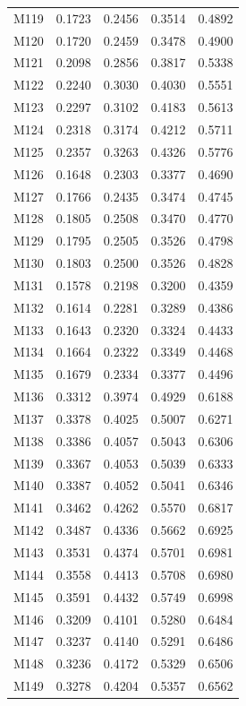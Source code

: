 \begin{longtable}{lrrrr}
M119 & 0.1723 & 0.2456 & 0.3514 & 0.4892 \\
M120 & 0.1720 & 0.2459 & 0.3478 & 0.4900 \\
M121 & 0.2098 & 0.2856 & 0.3817 & 0.5338 \\
M122 & 0.2240 & 0.3030 & 0.4030 & 0.5551 \\
M123 & 0.2297 & 0.3102 & 0.4183 & 0.5613 \\
M124 & 0.2318 & 0.3174 & 0.4212 & 0.5711 \\
M125 & 0.2357 & 0.3263 & 0.4326 & 0.5776 \\
M126 & 0.1648 & 0.2303 & 0.3377 & 0.4690 \\
M127 & 0.1766 & 0.2435 & 0.3474 & 0.4745 \\
M128 & 0.1805 & 0.2508 & 0.3470 & 0.4770 \\
M129 & 0.1795 & 0.2505 & 0.3526 & 0.4798 \\
M130 & 0.1803 & 0.2500 & 0.3526 & 0.4828 \\
M131 & 0.1578 & 0.2198 & 0.3200 & 0.4359 \\
M132 & 0.1614 & 0.2281 & 0.3289 & 0.4386 \\
M133 & 0.1643 & 0.2320 & 0.3324 & 0.4433 \\
M134 & 0.1664 & 0.2322 & 0.3349 & 0.4468 \\
M135 & 0.1679 & 0.2334 & 0.3377 & 0.4496 \\
M136 & 0.3312 & 0.3974 & 0.4929 & 0.6188 \\
M137 & 0.3378 & 0.4025 & 0.5007 & 0.6271 \\
M138 & 0.3386 & 0.4057 & 0.5043 & 0.6306 \\
M139 & 0.3367 & 0.4053 & 0.5039 & 0.6333 \\
M140 & 0.3387 & 0.4052 & 0.5041 & 0.6346 \\
M141 & 0.3462 & 0.4262 & 0.5570 & 0.6817 \\
M142 & 0.3487 & 0.4336 & 0.5662 & 0.6925 \\
M143 & 0.3531 & 0.4374 & 0.5701 & 0.6981 \\
M144 & 0.3558 & 0.4413 & 0.5708 & 0.6980 \\
M145 & 0.3591 & 0.4432 & 0.5749 & 0.6998 \\
M146 & 0.3209 & 0.4101 & 0.5280 & 0.6484 \\
M147 & 0.3237 & 0.4140 & 0.5291 & 0.6486 \\
M148 & 0.3236 & 0.4172 & 0.5329 & 0.6506 \\
M149 & 0.3278 & 0.4204 & 0.5357 & 0.6562 \\

\end{longtable}
